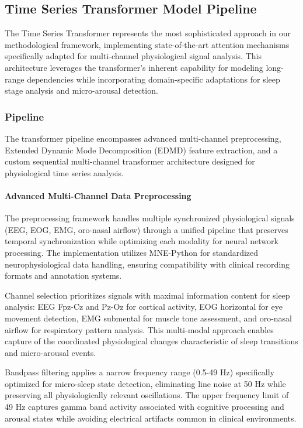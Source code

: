 \documentclass[a4paper,12pt,twoside]{article}
\begin{document}
\subsection{Time Series Transformer Model Pipeline}

The Time Series Transformer represents the most sophisticated approach in our methodological framework, implementing state-of-the-art attention mechanisms specifically adapted for multi-channel physiological signal analysis. This architecture leverages the transformer's inherent capability for modeling long-range dependencies while incorporating domain-specific adaptations for sleep stage analysis and micro-arousal detection.

\subsubsection{Pipeline}

The transformer pipeline encompasses advanced multi-channel preprocessing, Extended Dynamic Mode Decomposition (EDMD) feature extraction, and a custom sequential multi-channel transformer architecture designed for physiological time series analysis.

\paragraph{Advanced Multi-Channel Data Preprocessing}

The preprocessing framework handles multiple synchronized physiological signals (EEG, EOG, EMG, oro-nasal airflow) through a unified pipeline that preserves temporal synchronization while optimizing each modality for neural network processing. The implementation utilizes MNE-Python for standardized neurophysiological data handling, ensuring compatibility with clinical recording formats and annotation systems.

Channel selection prioritizes signals with maximal information content for sleep analysis: EEG Fpz-Cz and Pz-Oz for cortical activity, EOG horizontal for eye movement detection, EMG submental for muscle tone assessment, and oro-nasal airflow for respiratory pattern analysis. This multi-modal approach enables capture of the coordinated physiological changes characteristic of sleep transitions and micro-arousal events.

Bandpass filtering applies a narrow frequency range (0.5-49 Hz) specifically optimized for micro-sleep state detection, eliminating line noise at 50 Hz while preserving all physiologically relevant oscillations. The upper frequency limit of 49 Hz captures gamma band activity associated with cognitive processing and arousal states while avoiding electrical artifacts common in clinical environments.
\end{document}
